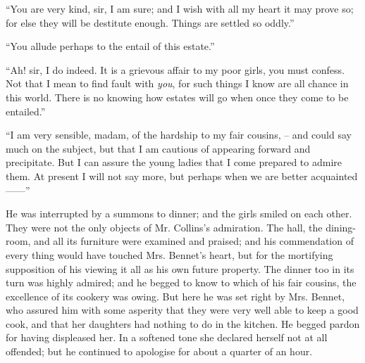 “You are very kind, sir, I am sure; and I wish with all
my heart it may prove so; for else they will be destitute
enough. Things are settled so oddly.”

“You allude perhaps to the entail of this estate.”

“Ah! sir, I do indeed. It is a grievous affair to my
poor girls, you must confess. Not that I mean to find
fault with \textit{you}, for such things I know are all chance in
this world. There is no knowing how estates will go when
once they come to be entailed.”

“I am very sensible, madam, of the hardship to my
fair cousins, -- and could say much on the subject, but that
I am cautious of appearing forward and precipitate.
But I can assure the young ladies that I come prepared
to admire them. At present I will not say more, but
perhaps when we are better acquainted------”

He was interrupted by a summons to dinner; and the
girls smiled on each other. They were not the only objects
of Mr. Collins’s admiration. The hall, the dining-room,
and all its furniture were examined and praised; and his
commendation of every thing would have touched Mrs.
Bennet’s heart, but for the mortifying supposition of his
viewing it all as his own future property. The dinner too
in its turn was highly admired; and he begged to know
to which of his fair cousins, the excellence of its cookery
was owing. But here he was set right by Mrs. Bennet,
who assured him with some asperity that they were very
well able to keep a good cook, and that her daughters had
nothing to do in the kitchen. He begged pardon for having
displeased her. In a softened tone she declared herself
not at all offended; but he continued to apologise for
about a quarter of an hour.


